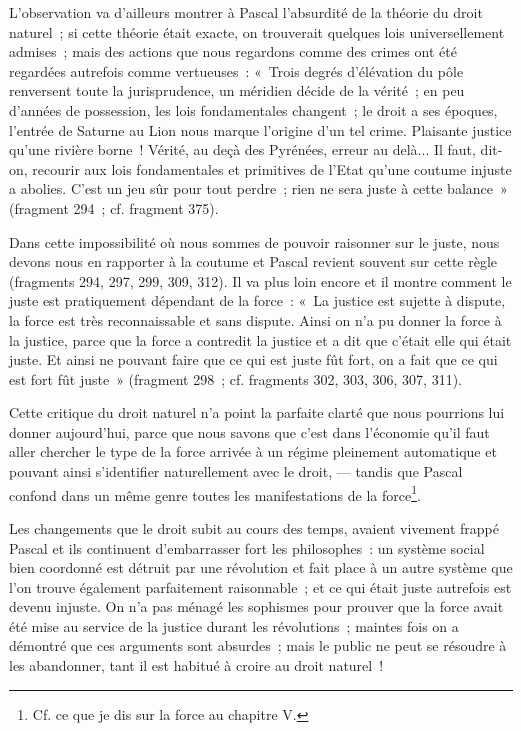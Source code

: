 \documentclass[french,twoside]{book} %
\begin{document}
L’observation va d’ailleurs montrer à Pascal l’absurdité de la théorie du droit naturel ; si cette théorie était exacte, on trouverait quelques lois universellement admises ; mais des actions que nous regardons comme des crimes ont été regardées autrefois comme vertueuses : « Trois degrés d’élévation du pôle renversent toute la jurisprudence, un méridien décide de la vérité ; en peu d’années de possession, les lois fondamentales changent ; le droit a ses époques, l’entrée de Saturne au Lion nous marque l’origine d’un tel crime. Plaisante justice qu’une rivière borne ! Vérité, au deçà des Pyrénées, erreur au delà... Il faut, dit-on, recourir aux lois fondamentales et primitives de l’Etat qu’une coutume injuste a abolies. C’est un jeu sûr pour tout perdre ; rien ne sera juste à cette balance » (fragment 294 ; cf. fragment 375).\par
Dans cette impossibilité où nous sommes de pouvoir raisonner sur le juste, nous devons nous en rapporter à la coutume et Pascal revient souvent sur cette règle (fragments 294, 297, 299, 309, 312). Il va plus loin encore et il montre comment le juste est pratiquement dépendant de la force : « La justice est sujette à dispute, la force est très reconnaissable et sans dispute. Ainsi on n’a pu donner la force à la justice, parce que la force a contredit la justice et a dit que c’était elle qui était juste. Et ainsi ne pouvant faire que ce qui est juste fût fort, on a fait que ce qui est fort fût juste » (fragment 298 ; cf. fragments 302, 303, 306, 307, 311).\par
Cette critique du droit naturel n’a point la parfaite clarté que nous pourrions lui donner aujourd’hui, parce que nous savons que c’est dans l’économie qu’il faut aller  chercher le type de la force arrivée à un régime pleinement automatique et pouvant ainsi s’identifier naturellement avec le droit, — tandis que Pascal confond dans un même genre toutes les manifestations de la force\footnote{ \noindent Cf. ce que je dis sur la force au chapitre V.
 }.\par
Les changements que le droit subit au cours des temps, avaient vivement frappé Pascal et ils continuent d’embarrasser fort les philosophes : un système social bien coordonné est détruit par une révolution et fait place à un autre système que l’on trouve également parfaitement raisonnable ; et ce qui était juste autrefois est devenu injuste. On n’a pas ménagé les sophismes pour prouver que la force avait été mise au service de la justice durant les révolutions ; maintes fois on a démontré que ces arguments sont absurdes ; mais le public ne peut se résoudre à les abandonner, tant il est habitué à croire au droit naturel !\par
\end{document}
